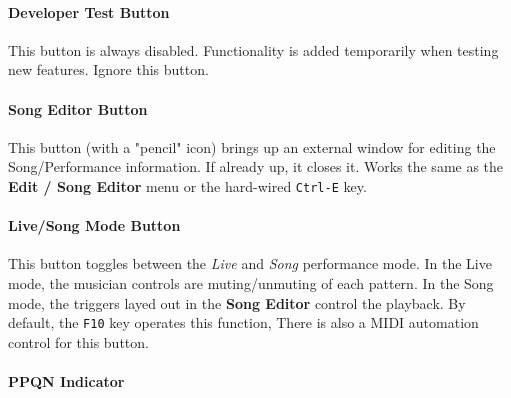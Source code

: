 \documentclass[
 11pt,
 twoside,
 a4paper,
 final                                 %
]{article}
\begin{document}
\paragraph{Developer Test Button}
\label{paragraph:introduction_developer_test_button}

   This button is always disabled.  Functionality is added temporarily when
   testing new features. Ignore this button.

\paragraph{Song Editor Button}
\label{paragraph:introduction_song_editor_button}

   This button (with a "pencil" icon)
   brings up an external window for editing the Song/Performance
   information.  If already up, it closes it.  Works the same as the
   \textbf{Edit / Song Editor} menu or the hard-wired \texttt{Ctrl-E} key.

\paragraph{Live/Song Mode Button}
\label{paragraph:introduction_livesong_mode_button}

   This button toggles between the \textsl{Live} and \textsl{Song} performance
   mode. In the Live mode, the musician controls are muting/unmuting of each
   pattern.  In the Song mode, the triggers layed out in the
   \textbf{Song Editor} control the playback.
   By default, the \texttt{F10} key operates this function,
   There is also a MIDI automation control for this button.

\begin{comment}
   \itempar{Toggle Tracks}{pattern!toggle tracks}
   \index{pattern!toggle tracks}
   This button changes the status of all of the
   \textsl{playing} tracks, reversing the
   mute status of each pattern that is playing.
   The next click will then unmute only those tracks.
   Because it can be confusing, this button is disabled (not shown
   in the figure) in Song mode.

   LATER:  Describe
   \texttt{Ctrl-M},
   \texttt{Ctrl-U}, and
   \texttt{Ctrl-T}.

\end{comment}

\paragraph{PPQN Indicator}
\label{paragraph:introduction_ppqn_indicator}
\end{document}
